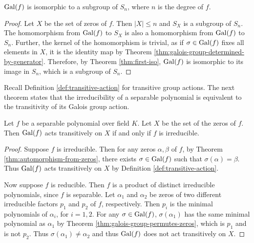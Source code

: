 \begin{corollary} \label{thm:galois-group-isomorphic-symmetric-subgroup}
	$\operatorname{Gal}(f)$ is isomorphic to a subgroup of $S_n$, where $n$ is the degree of $f$. 
\end{corollary}

\begin{proof}
	Let $X$ be the set of zeros of $f$. Then $|X| \le n$ and $S_X$ is a subgroup of $S_n$. The homomorphism from $\operatorname{Gal}(f)$ to $S_X$ is also a homomorphism from $\operatorname{Gal}(f)$ to $S_n$. Further, the kernel of the homomorphism is trivial, as if $\sigma \in \operatorname{Gal}(f)$ fixes all elements in $X$, it is the identity map by Theorem \ref{thm:galois-group-determined-by-generator}. Therefore, by Theorem \ref{thm:first-iso}, $\operatorname{Gal}(f)$ is isomorphic to its image in $S_n$, which is a subgroup of $S_n$. 
\end{proof}

Recall Definition \ref{def:transitive-action} for transitive group actions. The next theorem states that the irreducibility of a separable polynomial is equivalent to the transitivity of its Galois group action.

\begin{theorem} \label{thm:galois-action-transitive-irreducible}
	Let $f$ be a separable polynomial over field $K$. Let $X$ be the set of the zeros of $f$. Then $\operatorname{Gal}(f)$ acts transitively on $X$ if and only if $f$ is irreducible. 
\end{theorem}

\begin{proof}
	Suppose $f$ is irreducible. Then for any zeros $\alpha, \beta$ of $f$, by Theorem \ref{thm:automorphism-from-zeros}, there exists $\sigma \in \operatorname{Gal}(f)$ such that $\sigma(\alpha) = \beta$. Thus $\operatorname{Gal}(f)$ acts transitively on $X$ by Definition \ref{def:transitive-action}. 
	
	Now suppose $f$ is reducible. Then $f$ is a product of distinct irreducible polynomials, since $f$ is separable. Let $\alpha_1$ and $\alpha_2$ be zeros of two different irreducible factors $p_1$ and $p_2$ of $f$, respectively. Then $p_i$ is the minimal polynomials of $\alpha_i$, for $i = 1, 2$. For any $\sigma \in \operatorname{Gal}(f)$, $\sigma(\alpha_1)$ has the same minimal polynomial as $\alpha_1$ by Theorem \ref{thm:galois-group-permutes-zeros}, which is $p_1$ and is not $p_2$. Thus $\sigma(\alpha_1) \neq \alpha_2$ and thus $\operatorname{Gal}(f)$ does not act transitively on $X$. 
\end{proof}


